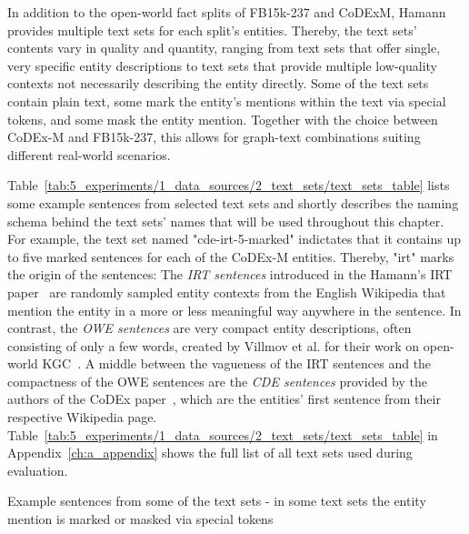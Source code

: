In addition to the open-world fact splits of FB15k-237 and CoDExM, Hamann provides multiple text sets for each split's entities. Thereby, the text sets' contents vary in quality and quantity, ranging from text sets that offer single, very specific entity descriptions to text sets that provide multiple low-quality contexts not necessarily describing the entity directly. Some of the text sets contain plain text, some mark the entity's mentions within the text via special tokens, and some mask the entity mention. Together with the choice between CoDEx-M and FB15k-237, this allows for graph-text combinations suiting different real-world scenarios.

Table~\ref{tab:5_experiments/1_data_sources/2_text_sets/text_sets_table} lists some example sentences from selected text sets and shortly describes the naming schema behind the text sets' names that will be used throughout this chapter. For example, the text set named "cde-irt-5-marked" indictates that it contains up to five marked sentences for each of the CoDEx-M entities. Thereby, "irt" marks the origin of the sentences: The \emph{IRT sentences} introduced in the Hamann's IRT paper~\cite{} are randomly sampled entity contexts from the English Wikipedia that mention the entity in a more or less meaningful way anywhere in the sentence. In contrast, the \emph{OWE sentences} are very compact entity descriptions, often consisting of only a few words, created by Villmov et al. for their work on open-world KGC~\cite{Shah2019AnOE}. A middle between the vagueness of the IRT sentences and the compactness of the OWE sentences are the \emph{CDE sentences} provided by the authors of the CoDEx paper~\cite{}, which are the entities' first sentence from their respective Wikipedia page. Table~\ref{tab:5_experiments/1_data_sources/2_text_sets/text_sets_table} in Appendix~\ref{ch:a_appendix} shows the full list of all text sets used during evaluation.

\begin{table}
    \centering
    
    \caption{Example sentences from some of the text sets - in some text sets the entity mention is marked or masked via special tokens}
    \label{tab:5_experiments/1_data_sources/2_text_sets/text_sets_table}
\end{table}
